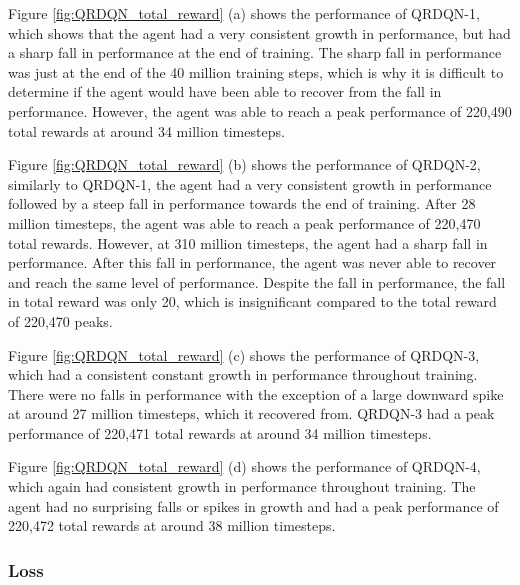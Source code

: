 Figure \ref{fig:QRDQN_total_reward} (a) shows the performance of QRDQN-1, which shows that the agent had a very consistent growth in performance, but had a sharp fall in performance at the end of training. The sharp fall in performance was just at the end of the 40 million training steps, which is why it is difficult to determine if the agent would have been able to recover from the fall in performance. However, the agent was able to reach a peak performance of 220,490 total rewards at around 34 million timesteps. 

Figure \ref{fig:QRDQN_total_reward} (b) shows the performance of QRDQN-2, similarly to QRDQN-1, the agent had a very consistent growth in performance followed by a steep fall in performance towards the end of training. After 28 million timesteps, the agent was able to reach a peak performance of 220,470 total rewards. However, at 310 million timesteps, the agent had a sharp fall in performance. After this fall in performance, the agent was never able to recover and reach the same level of performance. Despite the fall in performance, the fall in total reward was only 20, which is insignificant compared to the total reward of 220,470 peaks.

Figure \ref{fig:QRDQN_total_reward} (c) shows the performance of QRDQN-3, which had a consistent constant growth in performance throughout training. There were no falls in performance with the exception of a large downward spike at around 27 million timesteps, which it recovered from. QRDQN-3 had a peak performance of 220,471 total rewards at around 34 million timesteps.

Figure \ref{fig:QRDQN_total_reward} (d) shows the performance of QRDQN-4, which again had consistent growth in performance throughout training. The agent had no surprising falls or spikes in growth and had a peak performance of 220,472 total rewards at around 38 million timesteps.

\subsubsection{Loss}


